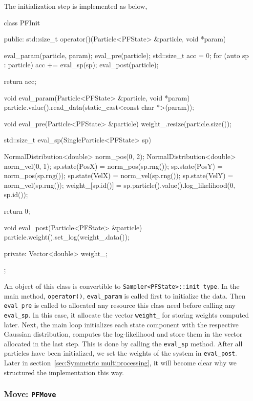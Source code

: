 The initialization step is implemented as below,
\begin{cppcode}
  class PFInit
  {
      public:
      std::size_t operator()(Particle<PFState> &particle, void *param)
      {
          eval_param(particle, param);
          eval_pre(particle);
          std::size_t acc = 0;
          for (auto sp : particle)
              acc += eval_sp(sp);
          eval_post(particle);

          return acc;
      }

      void eval_param(Particle<PFState> &particle, void *param)
      {
          particle.value().read_data(static_cast<const char *>(param));
      }

      void eval_pre(Particle<PFState> &particle)
      {
          weight_.resize(particle.size());
      }

      std::size_t eval_sp(SingleParticle<PFState> sp)
      {
          NormalDistribution<double> norm_pos(0, 2);
          NormalDistribution<double> norm_vel(0, 1);
          sp.state(PosX) = norm_pos(sp.rng());
          sp.state(PosY) = norm_pos(sp.rng());
          sp.state(VelX) = norm_vel(sp.rng());
          sp.state(VelY) = norm_vel(sp.rng());
          weight_[sp.id()] = sp.particle().value().log_likelihood(0, sp.id());

          return 0;
      }

      void eval_post(Particle<PFState> &particle)
      {
          particle.weight().set_log(weight_.data());
      }

      private:
      Vector<double> weight_;
  };
\end{cppcode}
An object of this class is convertible to \verb|Sampler<PFState>::init_type|.
In the main method, \verb|operator()|, \verb|eval_param| is called first to
initialize the data. Then \verb|eval_pre| is called to allocated any resource
this class need before calling any \verb|eval_sp|. In this case, it allocate
the vector \verb|weight_| for storing weights computed later. Next, the main
loop initializes each state component with the respective Gaussian
distribution, computes the log-likelihood and store them in the vector
allocated in the last step. This is done by calling the \verb|eval_sp| method.
After all particles have been initialized, we set the weights of the system in
\verb|eval_post|. Later in section~\ref{sec:Symmetric multiprocessing}, it will
become clear why we structured the implementation this way.

\subsubsection{Move: \texttt{PFMove}}

